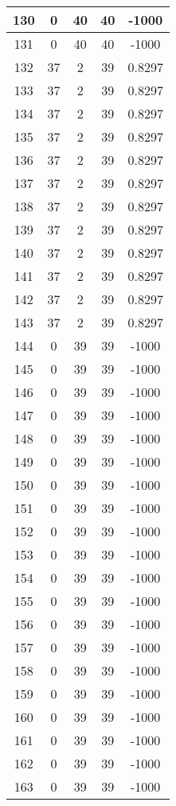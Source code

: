 \documentclass[letterpaper, 12pt]{article}
\begin{document}
\begin{longtable}{|c|c|c|c|c|}
\hline
130 & 0 & 40 & 40 & -1000 \\
\hline
131 & 0 & 40 & 40 & -1000 \\
\hline
132 & 37 & 2 & 39 & 0.8297 \\
\hline
133 & 37 & 2 & 39 & 0.8297 \\
\hline
134 & 37 & 2 & 39 & 0.8297 \\
\hline
135 & 37 & 2 & 39 & 0.8297 \\
\hline
136 & 37 & 2 & 39 & 0.8297 \\
\hline
137 & 37 & 2 & 39 & 0.8297 \\
\hline
138 & 37 & 2 & 39 & 0.8297 \\
\hline
139 & 37 & 2 & 39 & 0.8297 \\
\hline
140 & 37 & 2 & 39 & 0.8297 \\
\hline
141 & 37 & 2 & 39 & 0.8297 \\
\hline
142 & 37 & 2 & 39 & 0.8297 \\
\hline
143 & 37 & 2 & 39 & 0.8297 \\
\hline
144 & 0 & 39 & 39 & -1000 \\
\hline
145 & 0 & 39 & 39 & -1000 \\
\hline
146 & 0 & 39 & 39 & -1000 \\
\hline
147 & 0 & 39 & 39 & -1000 \\
\hline
148 & 0 & 39 & 39 & -1000 \\
\hline
149 & 0 & 39 & 39 & -1000 \\
\hline
150 & 0 & 39 & 39 & -1000 \\
\hline
151 & 0 & 39 & 39 & -1000 \\
\hline
152 & 0 & 39 & 39 & -1000 \\
\hline
153 & 0 & 39 & 39 & -1000 \\
\hline
154 & 0 & 39 & 39 & -1000 \\
\hline
155 & 0 & 39 & 39 & -1000 \\
\hline
156 & 0 & 39 & 39 & -1000 \\
\hline
157 & 0 & 39 & 39 & -1000 \\
\hline
158 & 0 & 39 & 39 & -1000 \\
\hline
159 & 0 & 39 & 39 & -1000 \\
\hline
160 & 0 & 39 & 39 & -1000 \\
\hline
161 & 0 & 39 & 39 & -1000 \\
\hline
162 & 0 & 39 & 39 & -1000 \\
\hline
163 & 0 & 39 & 39 & -1000 \\
\hline

\end{longtable}
\end{document}
